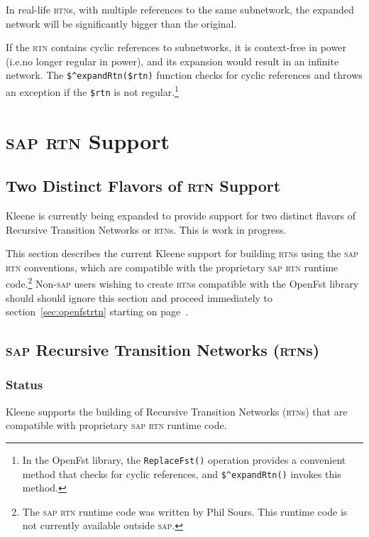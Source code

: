 \documentclass[letterpaper,12pt]{article}
\newcommand{\acro}{\textsc}
\begin{document}
\noindent
In real-life \acro{rtn}s, with multiple references to the same
subnetwork, the expanded network will be significantly bigger than the
original.  

If the \acro{rtn} contains cyclic references to subnetworks, it is
context-free in power (i.e.\@ no longer regular in power), and its
expansion would result in an infinite network.  The
\verb!$^expandRtn($rtn)! function checks for cyclic references and throws
an exception if the \verb!$rtn! is not regular.\footnote{In the OpenFst
library, the \verb!ReplaceFst()! operation provides a convenient method
that checks for cyclic references, and \verb!$^expandRtn()! invokes this
method.}

\section{\acro{sap} \acro{rtn} Support}

\label{sec:saprtn}

\subsection{Two Distinct Flavors of \acro{rtn} Support}

Kleene is currently being expanded to provide support for two distinct
flavors of Recursive Transition Networks or \acro{rtn}s.  This is work in
progress.

This section describes the current Kleene support for building
\acro{rtn}s using the \acro{sap} \acro{rtn} conventions, which are
compatible with the proprietary \acro{sap} \acro{rtn} runtime
code.\footnote{The \acro{sap} \acro{rtn} runtime code was written by Phil
Sours.  This runtime code is not currently available outside \acro{sap}.}
Non-\acro{sap} users wishing to create \acro{rtn}s compatible with the
OpenFst library should should ignore this section and proceed immediately
to section~\ref{sec:openfstrtn} starting on
page~\pageref{sec:openfstrtn}.

\subsection{\acro{sap} Recursive Transition Networks (\acro{rtn}s)}

\subsubsection{Status}

Kleene supports the building of Recursive Transition Networks
(\acro{rtn}s) that are compatible with proprietary \acro{sap} \acro{rtn}
runtime code.
\end{document}
